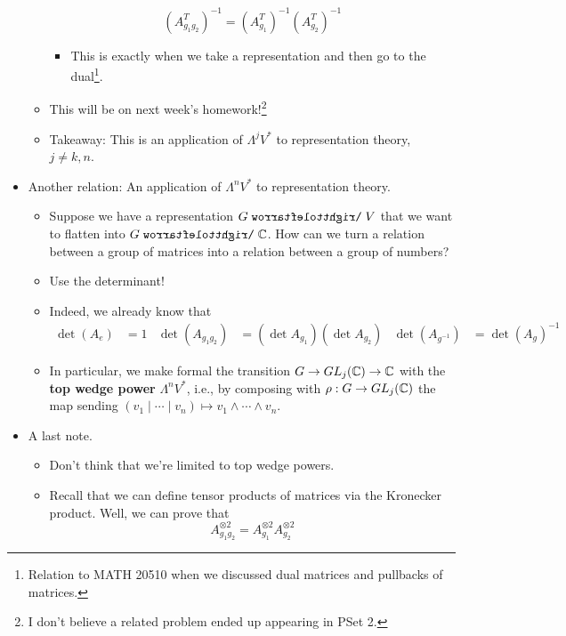 \documentclass[../notes.tex]{subfiles}
\begin{document}
\begin{itemize}
\begin{itemize}
        \begin{equation*}
            (A_{g_1g_2}^T)^{-1} = (A_{g_1}^T)^{-1}(A_{g_2}^T)^{-1}
        \end{equation*}
        \begin{itemize}
            \item This is exactly when we take a representation and then go to the dual\footnote{Relation to MATH 20510 when we discussed dual matrices and pullbacks of matrices.}.
        \end{itemize}
        \item This will be on next week's homework!\footnote{I don't believe a related problem ended up appearing in PSet 2.}
        \item Takeaway: This is an application of $\Lambda^jV^*$ to representation theory, $j\neq k,n$.
    \end{itemize}
    \item Another relation: An application of $\Lambda^nV^*$ to representation theory.
    \begin{itemize}
        \item Suppose we have a representation $G\acts V$ that we want to flatten into $G\acts\C$. How can we turn a relation between a group of matrices into a relation between a group of numbers?
        \item Use the determinant!
        \item Indeed, we already know that
        \begin{align*}
            \det(A_e) &= 1&
            \det(A_{g_1g_2}) &= (\det A_{g_1})(\det A_{g_2})&
            \det(A_{g^{-1}}) &= \det(A_g)^{-1}
        \end{align*}
        \item In particular, we make formal the transition $G\to GL_j(\mathbb{C})\to\mathbb{C}$ with the \textbf{top wedge power} $\Lambda^nV^*$, i.e., by composing with $\rho:G\to GL_j(\mathbb{C})$ the map sending $(v_1\mid\cdots\mid v_n)\mapsto v_1\wedge\cdots\wedge v_n$.
    \end{itemize}
    \item A last note.
    \begin{itemize}
        \item Don't think that we're limited to top wedge powers.
        \item Recall that we can define tensor products of matrices via the Kronecker product. Well, we can prove that
        \begin{equation*}
            A_{g_1g_2}^{\otimes 2} = A_{g_1}^{\otimes 2}A_{g_2}^{\otimes 2}

\end{equation*}
\end{itemize}
\end{itemize}
\end{document}
